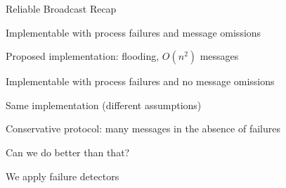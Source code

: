 \begin{frame}{Reliable Broadcast Recap}
	

\BI
  \item Implementable with process failures and message omissions
  \item Proposed implementation: flooding, $O(n^2)$ messages
\EI

\bigskip
{}

\BI
\item Implementable with process failures and no message omissions
\item Same implementation (different assumptions)
\EI

\bigskip
{}

\BI
\item Conservative protocol: many messages in the absence of failures
\item Can we do better than that?
\item We apply failure detectors
\EI

\end{frame}

\begin{frame}[shrink=10]{}


\begin{Procedure}
\caption{Reliable broadcast protocol based on $\diamond P$ executed by $p$}
\BlankLine
{}
\BlankLine
{}
\end{Procedure}

\end{frame}

